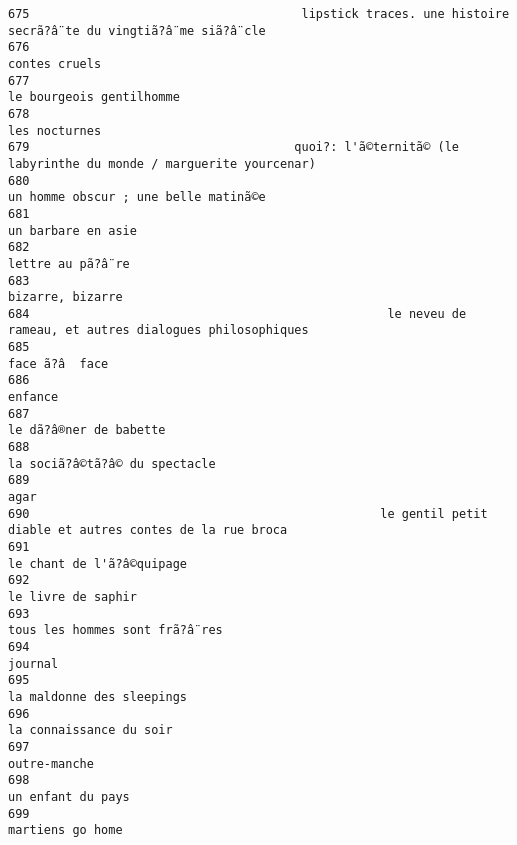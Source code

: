 \documentclass[
]{report}
\begin{document}
\begin{verbatim}
675                                      lipstick traces. une histoire secrã?â¨te du vingtiã?â¨me siã?â¨cle
676                                                                                           contes cruels
677                                                                                le bourgeois gentilhomme
678                                                                                           les nocturnes
679                                     quoi?: l'ã©ternitã© (le labyrinthe du monde / marguerite yourcenar)
680                                                                    un homme obscur ; une belle matinã©e
681                                                                                      un barbare en asie
682                                                                                       lettre au pã?â¨re
683                                                                                        bizarre, bizarre
684                                                  le neveu de rameau, et autres dialogues philosophiques
685                                                                                          face ã?â  face
686                                                                                                 enfance
687                                                                                  le dã?â®ner de babette
688                                                                           la sociã?â©tã?â© du spectacle
689                                                                                                    agar
690                                                 le gentil petit diable et autres contes de la rue broca
691                                                                               le chant de l'ã?â©quipage
692                                                                                      le livre de saphir
693                                                                          tous les hommes sont frã?â¨res
694                                                                                                 journal
695                                                                               la maldonne des sleepings
696                                                                                 la connaissance du soir
697                                                                                            outre-manche
698                                                                                       un enfant du pays
699                                                                                        martiens go home

\end{verbatim}
\end{document}
